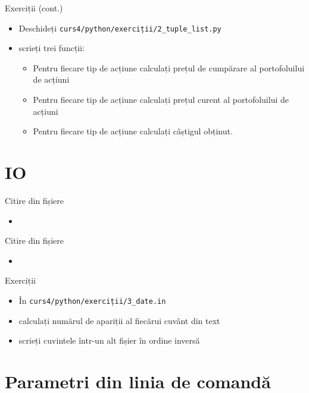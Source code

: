 \documentclass{beamer}
\begin{document}
\begin{frame}{Exerciții (cont.)}
  \begin{itemize}
  \item Deschideți \texttt{curs4/python/exerciții/2\_tuple\_list.py}
  \item scrieți trei funcții:
    \begin {itemize}
    \item Pentru fiecare tip de acțiune calculați prețul de cumpărare al portofoluilui de acțiuni
    \item Pentru fiecare tip de acțiune calculați prețul curent al portofoluilui de acțiuni
    \item Pentru fiecare tip de acțiune calculați câștigul obținut.
    \end{itemize}
  \end{itemize}
\end{frame}


\section{IO}
\frame{\tableofcontents[currentsection]}

\begin{frame}{Citire din fișiere}
  \begin{itemize}
  \item \small 
  \end{itemize}
\end{frame}

\begin{frame}{Citire din fișiere}
  \begin{itemize}
  \item \small 
  \end{itemize}
\end{frame}

\begin{frame}{Exerciții}
  \begin{itemize}
  \item În \texttt{curs4/python/exerciții/3\_date.in}
  \item calculați numărul de apariții al fiecărui cuvânt din text
  \item scrieți cuvintele într-un alt fișier în ordine inversă
  \end{itemize}
\end{frame}


\section{Parametri din linia de comandă}
\frame{\tableofcontents[currentsection]}
\end{document}
